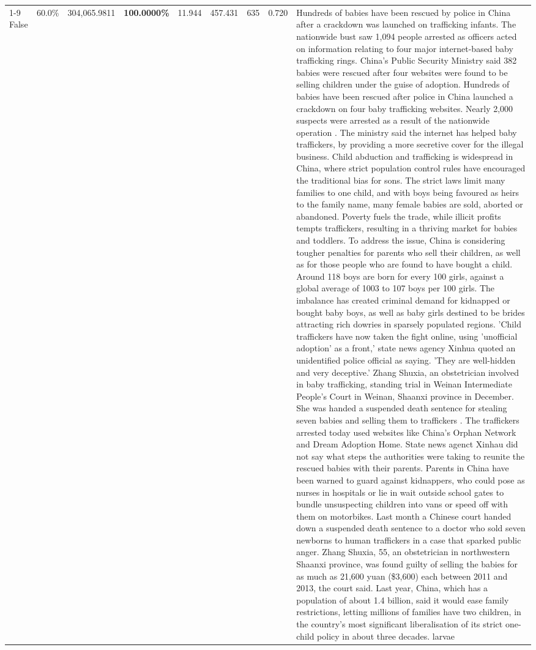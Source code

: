 \begin{table}[H]
\begin{tabular}{lllrlllll}
\cline{1-9}
False & 60.0\% & 304,065.9811 & \bfseries \color{red} 100.0000\% & 11.944 & 457.431 & 635 & 0.720 & Hundreds of babies have been rescued by police in China after a crackdown was launched on trafficking infants. The nationwide bust saw 1,094 people arrested as officers acted on information relating to four major internet-based baby trafficking rings. China's Public Security Ministry said 382 babies were rescued after four websites were found to be selling children under the guise of adoption. Hundreds of babies have been rescued after police in China launched a crackdown on four baby trafficking websites. Nearly 2,000 suspects were arrested as a result of the nationwide operation . The ministry said the internet has helped baby traffickers, by providing a more secretive cover for the illegal business. Child abduction and trafficking is widespread in China, where strict population control rules have encouraged the traditional bias for sons. The strict laws limit many families to one child, and with boys being favoured as heirs to the family name, many female babies are sold, aborted or abandoned. Poverty fuels the trade, while illicit profits tempts traffickers, resulting in a thriving market for babies and toddlers. To address the issue, China is considering tougher penalties for parents who sell their children, as well as for those people who are found to have bought a child. Around 118 boys are born for every 100 girls, against a global average of 1003 to 107 boys per 100 girls. The imbalance has created criminal demand for kidnapped or bought baby boys, as well as baby girls destined to be brides attracting rich dowries in sparsely populated regions. 'Child traffickers have now taken the fight online, using 'unofficial adoption' as a front,' state news agency Xinhua quoted an unidentified police official as saying. 'They are well-hidden and very deceptive.' Zhang Shuxia, an obstetrician involved in baby trafficking, standing trial in Weinan Intermediate People's Court in Weinan, Shaanxi province in December. She was handed a suspended death sentence for stealing seven babies and selling them to traffickers . The traffickers arrested today used websites like China's Orphan Network and Dream Adoption Home. State news agenct Xinhau did not say what steps the authorities were taking to reunite the rescued babies with their parents. Parents in China have been warned to guard against kidnappers, who could pose as nurses in hospitals or lie in wait outside school gates to bundle unsuspecting children into vans or speed off with them on motorbikes. Last month a Chinese court handed down a suspended death sentence to a doctor who sold seven newborns to human traffickers in a case that sparked public anger. Zhang Shuxia, 55, an obstetrician in northwestern Shaanxi province, was found guilty of selling the babies for as much as 21,600 yuan (\$3,600) each between 2011 and 2013, the court said. Last year, China, which has a population of about 1.4 billion, said it would ease family restrictions, letting millions of families have two children, in the country's most significant liberalisation of its strict one-child policy in about three decades. larvae \\

\end{tabular}
\end{table}
